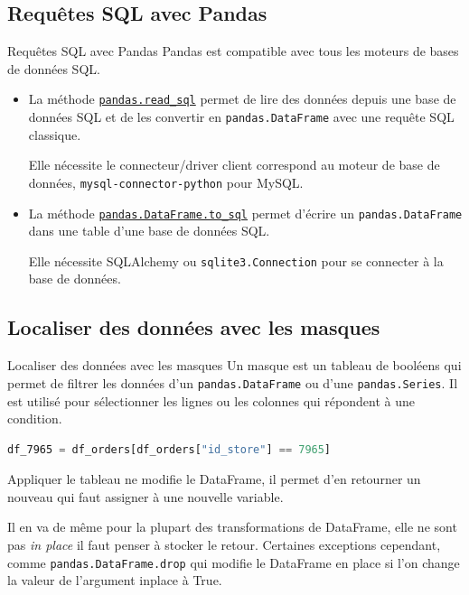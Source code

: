 \documentclass{beamer}
\begin{document}
    \subsection{Requêtes SQL avec Pandas}
    \begin{frame}{Requêtes SQL avec Pandas}
        Pandas est compatible avec tous les moteurs de bases de données SQL.
        \begin{itemize}
            \item La méthode \href{https://pandas.pydata.org/docs/reference/api/pandas.read_sql.html}{\lstinline{pandas.read_sql}} permet de lire des données depuis une base de données SQL et de les convertir en \lstinline{pandas.DataFrame} avec une requête SQL classique.
            \begin{dangercolorbox}
                Elle nécessite le connecteur/driver client correspond au moteur de base de données, \lstinline{mysql-connector-python} pour MySQL.
            \end{dangercolorbox}
            \item La méthode \href{https://pandas.pydata.org/docs/reference/api/pandas.DataFrame.to_sql.html}{\lstinline{pandas.DataFrame.to_sql}} permet d'écrire un \lstinline{pandas.DataFrame} dans une table d'une base de données SQL.
            \begin{dangercolorbox}
                Elle nécessite SQLAlchemy ou \lstinline{sqlite3.Connection} pour se connecter à la base de données.
            \end{dangercolorbox}
        \end{itemize}
    \end{frame}

    \subsection{Localiser des données avec les masques}
    \begin{frame}[fragile]{Localiser des données avec les masques}
        Un masque est un tableau de booléens qui permet de filtrer les données d'un \lstinline{pandas.DataFrame} ou d'une \lstinline{pandas.Series}.
        Il est utilisé pour sélectionner les lignes ou les colonnes qui répondent à une condition.
        \bigbreak
        \begin{lstlisting}[language=python]
df_7965 = df_orders[df_orders["id_store"] == 7965]
        \end{lstlisting}
        \begin{dangercolorbox}
            Appliquer le tableau ne modifie le DataFrame, il permet d'en retourner un nouveau qui faut assigner à une nouvelle variable.

            Il en va de même pour la plupart des transformations de DataFrame, elle ne sont pas \textit{in place} il faut penser à stocker le retour.
            Certaines exceptions cependant, comme \lstinline{pandas.DataFrame.drop} qui modifie le DataFrame en place si l'on change la valeur de l'argument inplace à True.
        \end{dangercolorbox}
    \end{frame}
\end{document}
